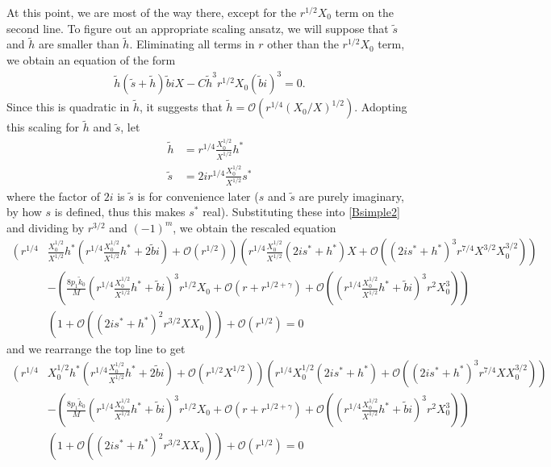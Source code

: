 \documentclass[thesis.tex]{subfiles}
\begin{document}
At this point, we are most of the way there, except for the $r^{1/2}X_0$ term on the second line. To figure out an appropriate scaling ansatz, we will suppose that $\tilde{s}$ and $\tilde{h}$ are smaller than $\tilde{h}$. Eliminating all terms in $r$ other than the $r^{1/2}X_0$ term, we obtain an equation of the form
\begin{equation}\label{Bsimpleansatz1}
\begin{aligned}
\tilde{h} (\tilde{s} + \tilde{h}) \tilde{b} i X 
- C \tilde{h}^3 r^{1/2} X_0 (\tilde{b} i)^3 = 0.
\end{aligned}
\end{equation} 
Since this is quadratic in $\tilde{h}$, it suggests that $\tilde{h} = \mathcal{O}(r^{1/4}(X_0/X)^{1/2})$. Adopting this scaling for $\tilde{h}$ and $\tilde{s}$, let
\begin{align*}
\tilde{h} &= r^{1/4}\frac{X_0^{1/2}}{X^{1/2}} h^* \\
\tilde{s} &= 2 i r^{1/4}\frac{X_0^{1/2}}{X^{1/2}} s^*
\end{align*}
where the factor of $2 i$ is $\tilde{s}$ is for convenience later ($s$ and $\tilde{s}$ are purely imaginary, by how $s$ is defined, thus this makes $s^*$ real). Substituting these into \cref{Bsimple2} and dividing by $r^{3/2}$ and $(-1)^m$, we obtain the rescaled equation
\begin{equation}\label{Bsimple5}
\begin{aligned}
\left( r^{1/4}\right.&\frac{X_0^{1/2}}{X^{1/2}} h^* \left.\left( r^{1/4}\frac{X_0^{1/2}}{X^{1/2}} h^* + 2 \tilde{b} i \right) + \mathcal{O}( r^{1/2} )\right)
\left( r^{1/4}\frac{X_0^{1/2}}{X^{1/2}} (2 i s^* + h^*)X + \mathcal{O}\left( (2 i s^* + h^*)^3 r^{7/4} X^{3/2}X_0^{3/2} \right) \right) \\ 
&- \left(\frac{8 p_1 \tilde{k}_0}{M} \left( r^{1/4}\frac{X_0^{1/2}}{X^{1/2}} h^* + \tilde{b}i\right)^3 r^{1/2} X_0 + \mathcal{O}(r + r^{1/2 + \gamma}) + \mathcal{O}\left( \left(r^{1/4}\frac{X_0^{1/2}}{X^{1/2}} h^* + \tilde{b}i \right)^3 r^2 X_0^3  \right) \right) \\
&\left( 1 + \mathcal{O}\left( (2 i s^* + h^*)^2 r^{3/2} X X_0 \right) \right) + \mathcal{O}( r^{1/2} ) = 0
\end{aligned}
\end{equation} 
and we rearrange the top line to get
\begin{equation}\label{Bsimple6}
\begin{aligned}
\left( r^{1/4}\right.&X_0^{1/2} h^* \left.\left( r^{1/4}\frac{X_0^{1/2}}{X^{1/2}} h^* + 2 \tilde{b} i \right) + \mathcal{O}( r^{1/2} X^{1/2} )\right)
\left( r^{1/4} X_0^{1/2} (2 i s^* + h^*) + \mathcal{O}\left( (2 i s^* + h^*)^3 r^{7/4} X X_0^{3/2} \right) \right) \\ 
&- \left(\frac{8 p_1 \tilde{k}_0}{M} \left( r^{1/4}\frac{X_0^{1/2}}{X^{1/2}} h^* + \tilde{b}i\right)^3 r^{1/2} X_0 + \mathcal{O}(r + r^{1/2 + \gamma}) + \mathcal{O}\left( \left(r^{1/4}\frac{X_0^{1/2}}{X^{1/2}} h^* + \tilde{b}i \right)^3 r^2 X_0^3  \right) \right) \\
&\left( 1 + \mathcal{O}\left( (2 i s^* + h^*)^2 r^{3/2} X X_0 \right) \right) + \mathcal{O}( r^{1/2} ) = 0
\end{aligned}
\end{equation}
\end{document}
